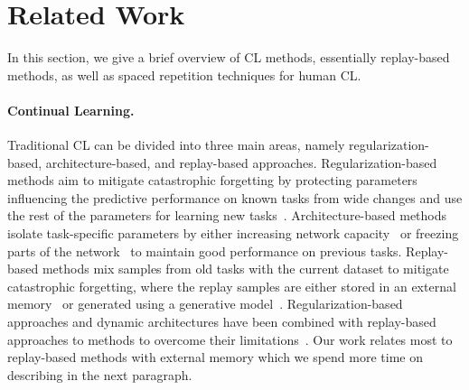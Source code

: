 
\section{Related Work}\label{paperC:sec:related_work}
In this section, we give a brief overview of CL methods, essentially replay-based methods, as well as spaced repetition techniques for human CL.

\vspace{-3mm}
\paragraph{Continual Learning.} Traditional CL can be divided into three main areas, namely regularization-based, architecture-based, and replay-based approaches. Regularization-based methods aim to mitigate catastrophic forgetting by protecting parameters influencing the predictive performance on known tasks from wide changes and use the rest of the parameters for learning new tasks~. Architecture-based methods isolate task-specific parameters by either increasing network capacity~ or freezing parts of the network~ to maintain good performance on previous tasks. 
Replay-based methods mix samples from old tasks with the current dataset to mitigate catastrophic forgetting, where the replay samples are either stored in an external memory~ or generated using a generative model~. 
Regularization-based approaches and dynamic architectures have been combined with replay-based approaches to methods to overcome their limitations~. Our work relates most to replay-based methods with external memory which we spend more time on describing in the next paragraph.

\vspace{-3mm}
